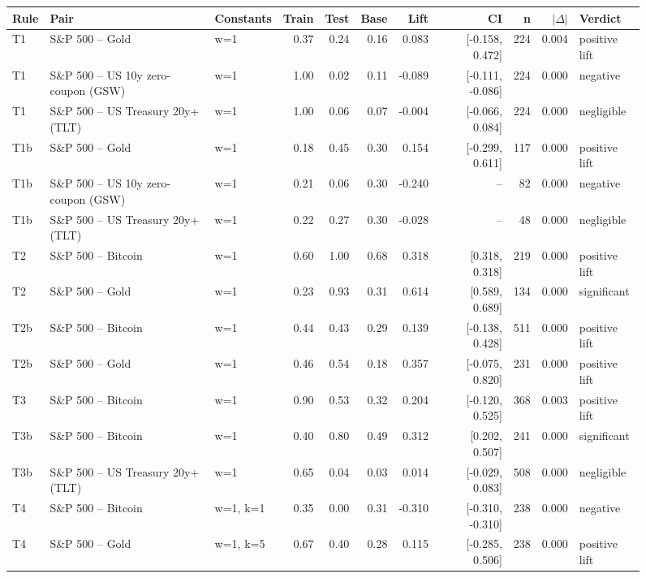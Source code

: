 \begin{figure}
\centering
\begin{tabular}{lllrrrrrrrl}
\toprule
Rule & Pair & Constants & Train & Test & Base & Lift & CI & n & $|\Delta|$ & Verdict \\
\midrule
T1 & S\&P 500 -- Gold & w=1 & 0.37 & 0.24 & 0.16 & 0.083 & [-0.158, 0.472] & 224 & 0.004 & positive lift \\
T1 & S\&P 500 -- US 10y zero-coupon (GSW) & w=1 & 1.00 & 0.02 & 0.11 & -0.089 & [-0.111, -0.086] & 224 & 0.000 & negative \\
T1 & S\&P 500 -- US Treasury 20y+ (TLT) & w=1 & 1.00 & 0.06 & 0.07 & -0.004 & [-0.066, 0.084] & 224 & 0.000 & negligible \\
T1b & S\&P 500 -- Gold & w=1 & 0.18 & 0.45 & 0.30 & 0.154 & [-0.299, 0.611] & 117 & 0.000 & positive lift \\
T1b & S\&P 500 -- US 10y zero-coupon (GSW) & w=1 & 0.21 & 0.06 & 0.30 & -0.240 & -- & 82 & 0.000 & negative \\
T1b & S\&P 500 -- US Treasury 20y+ (TLT) & w=1 & 0.22 & 0.27 & 0.30 & -0.028 & -- & 48 & 0.000 & negligible \\
T2 & S\&P 500 -- Bitcoin & w=1 & 0.60 & 1.00 & 0.68 & 0.318 & [0.318, 0.318] & 219 & 0.000 & positive lift \\
T2 & S\&P 500 -- Gold & w=1 & 0.23 & 0.93 & 0.31 & 0.614 & [0.589, 0.689] & 134 & 0.000 & significant \\
T2b & S\&P 500 -- Bitcoin & w=1 & 0.44 & 0.43 & 0.29 & 0.139 & [-0.138, 0.428] & 511 & 0.000 & positive lift \\
T2b & S\&P 500 -- Gold & w=1 & 0.46 & 0.54 & 0.18 & 0.357 & [-0.075, 0.820] & 231 & 0.000 & positive lift \\
T3 & S\&P 500 -- Bitcoin & w=1 & 0.90 & 0.53 & 0.32 & 0.204 & [-0.120, 0.525] & 368 & 0.003 & positive lift \\
T3b & S\&P 500 -- Bitcoin & w=1 & 0.40 & 0.80 & 0.49 & 0.312 & [0.202, 0.507] & 241 & 0.000 & significant \\
T3b & S\&P 500 -- US Treasury 20y+ (TLT) & w=1 & 0.65 & 0.04 & 0.03 & 0.014 & [-0.029, 0.083] & 508 & 0.000 & negligible \\
T4 & S\&P 500 -- Bitcoin & w=1, k=1 & 0.35 & 0.00 & 0.31 & -0.310 & [-0.310, -0.310] & 238 & 0.000 & negative \\
T4 & S\&P 500 -- Gold & w=1, k=5 & 0.67 & 0.40 & 0.28 & 0.115 & [-0.285, 0.506] & 238 & 0.000 & positive lift \\

\end{tabular}
\end{figure}
